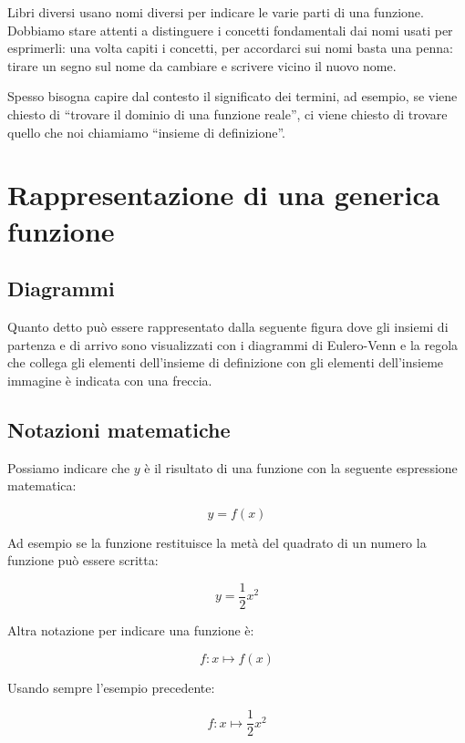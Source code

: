 Libri diversi usano nomi diversi per indicare le varie parti di una 
funzione. 
Dobbiamo stare attenti a distinguere i concetti fondamentali dai nomi 
usati per esprimerli: una volta capiti i concetti, per accordarci sui nomi 
basta una penna: tirare un segno sul nome da cambiare e scrivere vicino il 
nuovo nome.

Spesso bisogna capire dal contesto il significato dei termini, ad esempio, 
se viene chiesto di ``trovare il dominio di una funzione reale'', ci viene 
chiesto di trovare quello che noi chiamiamo ``insieme di definizione''.

\section{Rappresentazione di una generica funzione}
\label{sec:funzioni2_rappresentazione}

\subsection{Diagrammi}

Quanto detto può essere rappresentato dalla seguente figura dove gli 
insiemi di partenza e di arrivo sono visualizzati con i diagrammi di 
Eulero-Venn e la regola che collega gli elementi dell'insieme di definizione 
con gli elementi dell'insieme immagine è indicata con una freccia.

\begin{center}
\end{center}

\subsection{Notazioni matematiche}

Possiamo indicare che \(y\) è il risultato di una funzione con la seguente 
espressione matematica:

\[y=f(x)\]

Ad esempio se la funzione restituisce la metà del quadrato di un numero la 
funzione può essere scritta:

\[y=\frac{1}{2}x^2\]

Altra notazione per indicare una funzione è:

\[f: x \mapsto f(x)\]

Usando sempre l'esempio precedente:

\[f: x \mapsto \frac{1}{2}x^2\]

